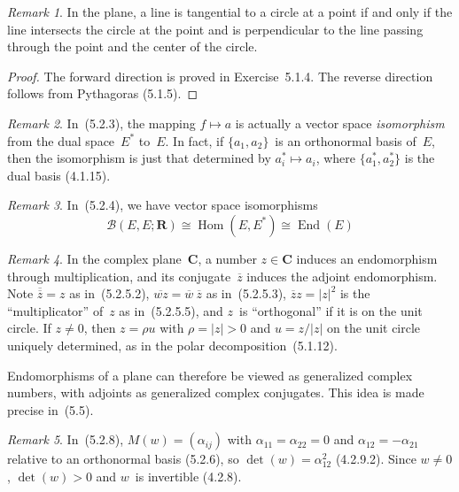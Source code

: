 \documentclass[letterpaper,12pt]{article}
\newcommand{\R}{\mathbf{R}}
\newcommand{\C}{\mathbf{C}}
\newcommand{\B}{\mathcal{B}}
\newcommand{\iso}{\cong}
\DeclareMathOperator{\Hom}{Hom}
\DeclareMathOperator{\End}{End}
\newcommand{\dual}[1]{#1^*}
\newcommand{\abs}[1]{|{#1}|}
\newcommand{\conj}[1]{\overline{#1}}
\theoremstyle{definition}
\theoremstyle{remark}
\newtheorem*{rmk}{Remark}
\begin{document}
\begin{rmk}
In the plane, a line is tangential to a circle at a point if and only if the line intersects the circle at the point and is perpendicular to the line passing through the point and the center of the circle.
\end{rmk}
\begin{proof}
The forward direction is proved in Exercise~5.1.4. The reverse direction follows from Pythagoras (5.1.5).
\end{proof}

\begin{rmk}
In~(5.2.3), the mapping \(f\mapsto a\) is actually a vector space \emph{isomorphism} from the dual space~\(\dual{E}\) to~\(E\). In fact, if \(\{a_1,a_2\}\)~is an orthonormal basis of~\(E\), then the isomorphism is just that determined by \(\dual{a_i}\mapsto a_i\), where \(\{\dual{a_1},\dual{a_2}\}\) is the dual basis (4.1.15).
\end{rmk}

\begin{rmk}
In~(5.2.4), we have vector space isomorphisms
\[\B(E,E;\R)\iso\Hom(E,\dual{E})\iso\End(E)\]
\end{rmk}

\begin{rmk}
In the complex plane~\(\C\), a number \(z\in\C\) induces an endomorphism through multiplication, and its conjugate~\(\conj{z}\) induces the adjoint endomorphism. Note \(\conj{\conj{z}}=z\) as in~(5.2.5.2), \(\conj{wz}=\conj{w}\ \conj{z}\) as in~(5.2.5.3), \(\conj{z}z=\abs{z}^2\) is the ``multiplicator'' of~\(z\) as in~(5.2.5.5), and \(z\)~is ``orthogonal'' if it is on the unit circle. If \(z\ne 0\), then \(z=\rho u\) with \(\rho=\abs{z}>0\) and \(u=z/\abs{z}\) on the unit circle uniquely determined, as in the polar decomposition~(5.1.12).

Endomorphisms of a plane can therefore be viewed as generalized complex numbers, with adjoints as generalized complex conjugates. This idea is made precise in~(5.5).
\end{rmk}

\begin{rmk}
In~(5.2.8), \(M(w)=(\alpha_{ij})\) with \(\alpha_{11}=\alpha_{22}=0\) and \(\alpha_{12}=-\alpha_{21}\) relative to an orthonormal basis (5.2.6), so \(\det(w)=\alpha_{12}^2\) (4.2.9.2). Since \(w\ne 0\), \(\det(w)>0\) and \(w\)~is invertible (4.2.8).
\end{rmk}
\end{document}
